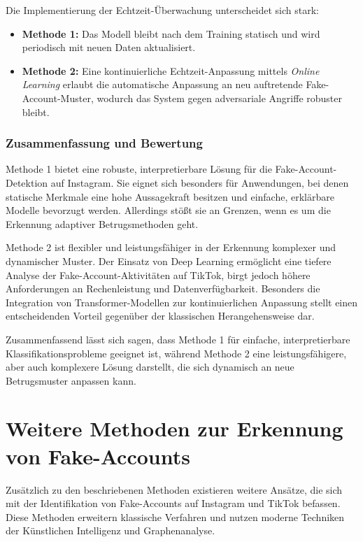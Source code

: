\documentclass[12pt]{report}
\begin{document}
Die Implementierung der Echtzeit-Überwachung unterscheidet sich stark:

\begin{itemize}
	\item \textbf{Methode 1:} Das Modell bleibt nach dem Training statisch und wird periodisch mit neuen Daten aktualisiert.
	\item \textbf{Methode 2:} Eine kontinuierliche Echtzeit-Anpassung mittels \textit{Online Learning} erlaubt die automatische Anpassung an neu auftretende Fake-Account-Muster, wodurch das System gegen adversariale Angriffe robuster bleibt.
\end{itemize}

\subsubsection{Zusammenfassung und Bewertung}

Methode 1 bietet eine robuste, interpretierbare Lösung für die Fake-Account-Detektion auf Instagram. Sie eignet sich besonders für Anwendungen, bei denen statische Merkmale eine hohe Aussagekraft besitzen und einfache, erklärbare Modelle bevorzugt werden. Allerdings stößt sie an Grenzen, wenn es um die Erkennung adaptiver Betrugsmethoden geht.

Methode 2 ist flexibler und leistungsfähiger in der Erkennung komplexer und dynamischer Muster. Der Einsatz von Deep Learning ermöglicht eine tiefere Analyse der Fake-Account-Aktivitäten auf TikTok, birgt jedoch höhere Anforderungen an Rechenleistung und Datenverfügbarkeit. Besonders die Integration von Transformer-Modellen zur kontinuierlichen Anpassung stellt einen entscheidenden Vorteil gegenüber der klassischen Herangehensweise dar.

Zusammenfassend lässt sich sagen, dass Methode 1 für einfache, interpretierbare Klassifikationsprobleme geeignet ist, während Methode 2 eine leistungsfähigere, aber auch komplexere Lösung darstellt, die sich dynamisch an neue Betrugsmuster anpassen kann.



\section{Weitere Methoden zur Erkennung von Fake-Accounts}

Zusätzlich zu den beschriebenen Methoden existieren weitere Ansätze, die sich mit der Identifikation von Fake-Accounts auf Instagram und TikTok befassen. Diese Methoden erweitern klassische Verfahren und nutzen moderne Techniken der Künstlichen Intelligenz und Graphenanalyse.
\end{document}
